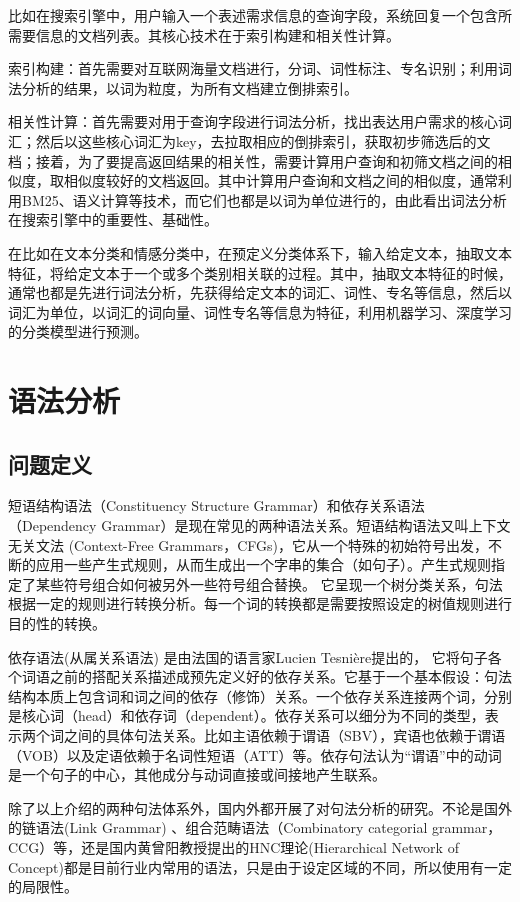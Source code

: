 比如在搜索引擎中，用户输入一个表述需求信息的查询字段，系统回复一个包含所需要信息的文档列表。其核心技术在于索引构建和相关性计算。

索引构建：首先需要对互联网海量文档进行，分词、词性标注、专名识别；利用词法分析的结果，以词为粒度，为所有文档建立倒排索引。

相关性计算：首先需要对用于查询字段进行词法分析，找出表达用户需求的核心词汇；然后以这些核心词汇为key，去拉取相应的倒排索引，获取初步筛选后的文档；接着，为了要提高返回结果的相关性，需要计算用户查询和初筛文档之间的相似度，取相似度较好的文档返回。其中计算用户查询和文档之间的相似度，通常利用BM25、语义计算等技术，而它们也都是以词为单位进行的，由此看出词法分析在搜索引擎中的重要性、基础性。

在比如在文本分类和情感分类中，在预定义分类体系下，输入给定文本，抽取文本特征，将给定文本于一个或多个类别相关联的过程。其中，抽取文本特征的时候，通常也都是先进行词法分析，先获得给定文本的词汇、词性、专名等信息，然后以词汇为单位，以词汇的词向量、词性专名等信息为特征，利用机器学习、深度学习的分类模型进行预测。


\section{语法分析}
\subsection{问题定义}
短语结构语法（Constituency Structure Grammar）和依存关系语法（Dependency Grammar）是现在常见的两种语法关系。短语结构语法又叫上下文无关文法 (Context-Free Grammars，CFGs)，它从一个特殊的初始符号出发，不断的应用一些产生式规则，从而生成出一个字串的集合（如句子）。产生式规则指定了某些符号组合如何被另外一些符号组合替换。
它呈现一个树分类关系，句法根据一定的规则进行转换分析。每一个词的转换都是需要按照设定的树值规则进行目的性的转换。

依存语法(从属关系语法) 是由法国的语言家Lucien Tesnière提出的\cite{tesniere1959elements}，
它将句子各个词语之前的搭配关系描述成预先定义好的依存关系。它基于一个基本假设：句法结构本质上包含词和词之间的依存（修饰）关系。一个依存关系连接两个词，分别是核心词（head）和依存词（dependent）。依存关系可以细分为不同的类型，表示两个词之间的具体句法关系。比如主语依赖于谓语（SBV），宾语也依赖于谓语（VOB）以及定语依赖于名词性短语（ATT）等。依存句法认为“谓语”中的动词是一个句子的中心，其他成分与动词直接或间接地产生联系。

除了以上介绍的两种句法体系外，国内外都开展了对句法分析的研究。不论是国外的链语法(Link Grammar) 、组合范畴语法（Combinatory categorial grammar，CCG）等，还是国内黄曾阳教授提出的HNC理论(Hierarchical Network of Concept)\cite{黄曾阳:12}都是目前行业内常用的语法，只是由于设定区域的不同，所以使用有一定的局限性。

